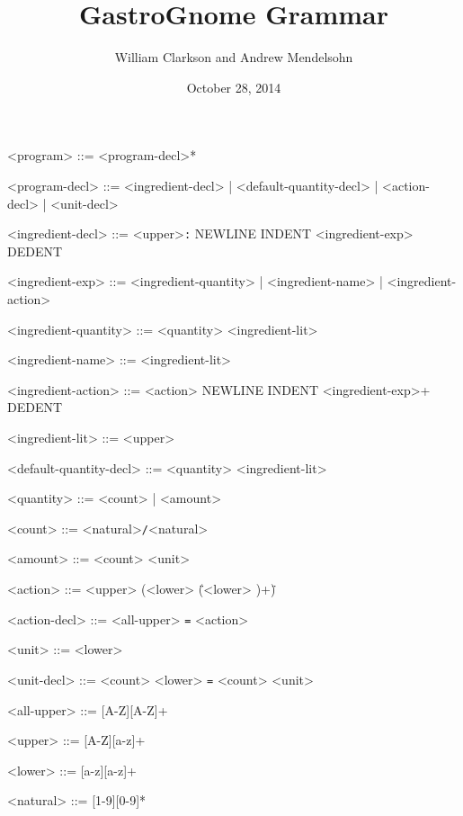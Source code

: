 \documentclass{article}
\title{ GastroGnome Grammar}
\author{William Clarkson and Andrew Mendelsohn}
\date{October 28, 2014}
\begin{document}
\maketitle
\thispagestyle{empty}

\begin{grammar}
<program>         ::= <program-decl>*

<program-decl>    ::= <ingredient-decl>
				  | <default-quantity-decl>
				  | <action-decl>
				  | <unit-decl>

<ingredient-decl> ::= <upper>\texttt{:} NEWLINE INDENT <ingredient-exp> DEDENT

<ingredient-exp> ::= <ingredient-quantity> | <ingredient-name> | <ingredient-action>

<ingredient-quantity> ::= <quantity> <ingredient-lit>

<ingredient-name> ::= <ingredient-lit>

<ingredient-action> ::= <action> NEWLINE INDENT <ingredient-exp>+ DEDENT

<ingredient-lit> ::= <upper>  

<default-quantity-decl> ::= <quantity> <ingredient-lit>

<quantity> ::= <count> | <amount>

<count> ::= <natural>\texttt{/}<natural>

<amount> ::= <count> <unit>

<action> ::= <upper> (<lower> \texttt{\"}(<lower> )+\texttt{\"})

<action-decl> ::= <all-upper> \texttt{=} <action>

<unit> ::= <lower>

<unit-decl> ::= <count> <lower> \texttt{=} <count> <unit>

<all-upper> ::= [A-Z][A-Z]+

<upper> ::= [A-Z][a-z]+

<lower> ::= [a-z][a-z]+

<natural> ::= [1-9][0-9]*

\end{grammar}
\end{document}
